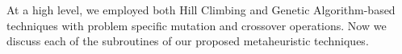 At a high level, we employed both Hill Climbing and Genetic Algorithm-based techniques with problem specific mutation and crossover operations. 
Now we discuss each of the subroutines of our proposed metaheuristic techniques.
